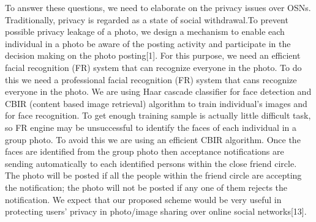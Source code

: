 \vspace*{1pc}
To answer these questions, we need to elaborate on the privacy issues over OSNs. Traditionally, privacy is regarded as a state of social withdrawal.To prevent possible privacy leakage of a photo, we design a mechanism to enable each individual in a photo be aware of the posting activity and participate in the decision making on the photo posting[1]. For this purpose, we need an efficient facial recognition (FR) system that can recognize everyone in the photo. To do this we need a professional facial recognition (FR) system that cans recognize everyone in the photo. We are using Haar cascade classifier for face detection and CBIR (content based image retrieval) algorithm to train individual’s images and for face recognition. To get enough training sample is actually little difficult task, so FR engine may be unsuccessful to identify the faces of each individual in a group photo. To avoid this we are using an efficient CBIR algorithm. Once the faces are identified from the group photo then acceptance notifications are sending automatically to each identified persons within the close friend circle. The photo will be posted if all the people within the friend circle are accepting the notification; the photo will not be posted if any one of them rejects the notification. We expect that our proposed scheme would be very useful in protecting users’ privacy in photo/image sharing over online social networks[13].


